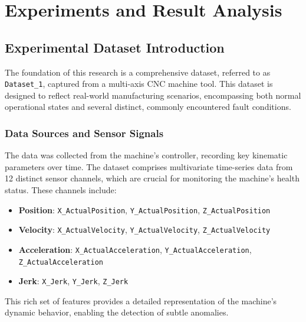 \chapter{Experiments and Result Analysis}
\label{cha:experiments}

\section{Experimental Dataset Introduction}
\label{sec:experiments:dataset}

The foundation of this research is a comprehensive dataset, referred to as \texttt{Dataset\_1}, captured from a multi-axis CNC machine tool. This dataset is designed to reflect real-world manufacturing scenarios, encompassing both normal operational states and several distinct, commonly encountered fault conditions.

\subsection{Data Sources and Sensor Signals}
The data was collected from the machine's controller, recording key kinematic parameters over time. The dataset comprises multivariate time-series data from 12 distinct sensor channels, which are crucial for monitoring the machine's health status. These channels include:
\begin{itemize}
    \item \textbf{Position}: \texttt{X\_ActualPosition}, \texttt{Y\_ActualPosition}, \texttt{Z\_ActualPosition}
    \item \textbf{Velocity}: \texttt{X\_ActualVelocity}, \texttt{Y\_ActualVelocity}, \texttt{Z\_ActualVelocity}
    \item \textbf{Acceleration}: \texttt{X\_ActualAcceleration}, \texttt{Y\_ActualAcceleration}, \texttt{Z\_ActualAcceleration}
    \item \textbf{Jerk}: \texttt{X\_Jerk}, \texttt{Y\_Jerk}, \texttt{Z\_Jerk}
\end{itemize}
This rich set of features provides a detailed representation of the machine's dynamic behavior, enabling the detection of subtle anomalies.

